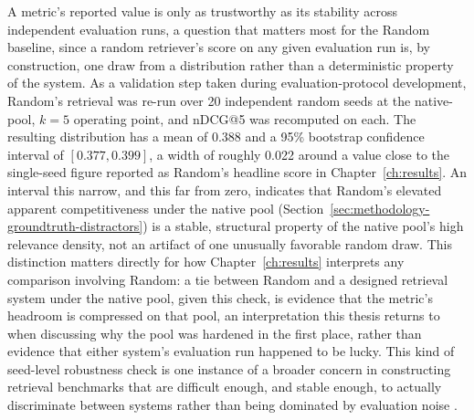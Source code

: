 A metric's reported value is only as trustworthy as its stability across independent evaluation
runs, a question that matters most for the Random baseline, since a random retriever's score on any
given evaluation run is, by construction, one draw from a distribution rather than a deterministic
property of the system. As a validation step taken during evaluation-protocol development, Random's
retrieval was re-run over 20 independent random seeds at the native-pool, $k=5$ operating point, and
nDCG@5 was recomputed on each. The resulting distribution has a mean of 0.388 and a 95\% bootstrap
confidence interval \cite{efron1993bootstrap} of $[0.377, 0.399]$, a width of roughly 0.022 around a
value close to the single-seed figure reported as Random's headline score in
Chapter~\ref{ch:results}. An interval this narrow, and this far from zero, indicates that Random's
elevated apparent competitiveness under the native pool (Section~\ref{sec:methodology-groundtruth-distractors})
is a stable, structural property of the native pool's high relevance density, not an artifact of one
unusually favorable random draw. This distinction matters directly for how Chapter~\ref{ch:results}
interprets any comparison involving Random: a tie between Random and a designed retrieval system
under the native pool, given this check, is evidence that the metric's headroom is compressed on
that pool, an interpretation this thesis returns to when discussing why the pool was hardened in the
first place, rather than evidence that either system's evaluation run happened to be lucky. This kind
of seed-level robustness check is one instance of a broader concern in constructing retrieval
benchmarks that are difficult enough, and stable enough, to actually discriminate between systems
rather than being dominated by evaluation noise \cite{thakur2025freshstack}.
